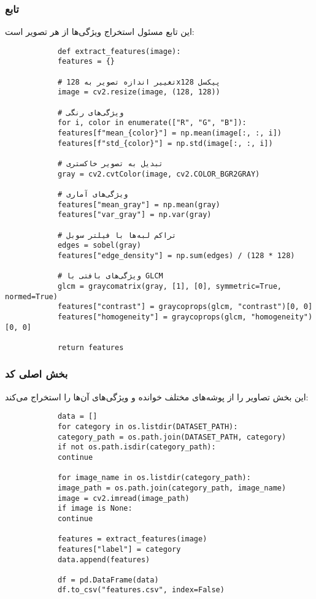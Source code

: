 \documentclass[a4paper,12pt]{article}
\begin{document}
	\subsubsection{تابع }
	این تابع مسئول استخراج ویژگی‌ها از هر تصویر است:
	\begin{latin}
		\begin{verbatim}
			def extract_features(image):
			features = {}
			
			# تغییر اندازه تصویر به 128x128 پیکسل
			image = cv2.resize(image, (128, 128))
			
			# ویژگی‌های رنگی
			for i, color in enumerate(["R", "G", "B"]):
			features[f"mean_{color}"] = np.mean(image[:, :, i])
			features[f"std_{color}"] = np.std(image[:, :, i])
			
			# تبدیل به تصویر خاکستری
			gray = cv2.cvtColor(image, cv2.COLOR_BGR2GRAY)
			
			# ویژگی‌های آماری
			features["mean_gray"] = np.mean(gray)
			features["var_gray"] = np.var(gray)
			
			# تراکم لبه‌ها با فیلتر سوبل
			edges = sobel(gray)
			features["edge_density"] = np.sum(edges) / (128 * 128)
			
			# ویژگی‌های بافتی با GLCM
			glcm = graycomatrix(gray, [1], [0], symmetric=True, normed=True)
			features["contrast"] = graycoprops(glcm, "contrast")[0, 0]
			features["homogeneity"] = graycoprops(glcm, "homogeneity")[0, 0]
			
			return features
		\end{verbatim}
	\end{latin}
	
	\subsubsection{بخش اصلی کد}
	این بخش تصاویر را از پوشه‌های مختلف خوانده و ویژگی‌های آن‌ها را استخراج می‌کند:
	\begin{latin}
		\begin{verbatim}
			data = []
			for category in os.listdir(DATASET_PATH):
			category_path = os.path.join(DATASET_PATH, category)
			if not os.path.isdir(category_path):
			continue
			
			for image_name in os.listdir(category_path):
			image_path = os.path.join(category_path, image_name)
			image = cv2.imread(image_path)
			if image is None:
			continue
			
			features = extract_features(image)
			features["label"] = category
			data.append(features)
			
			df = pd.DataFrame(data)
			df.to_csv("features.csv", index=False)
		\end{verbatim}
	\end{latin}
	
\end{document}
